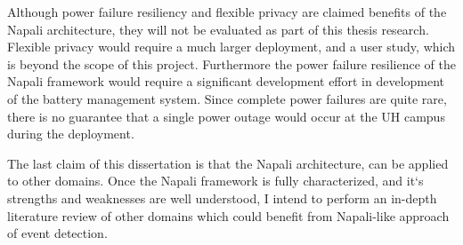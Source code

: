 Although power failure resiliency and flexible privacy are claimed benefits of the Napali architecture, they will not be evaluated as part of this thesis research. Flexible privacy would require a much larger deployment, and a user study, which is beyond the scope of this project. Furthermore the power failure resilience of the Napali framework would require a significant development effort in development of the battery management system. Since complete power failures are quite rare, there is no guarantee that a single power outage would occur at the UH campus during the deployment. 

The last claim of this dissertation is that the Napali architecture, can be applied to other domains. Once the Napali framework is fully characterized, and it`s strengths and weaknesses are well understood, I intend to perform an in-depth literature review of other domains which could benefit from Napali-like approach of event detection.

